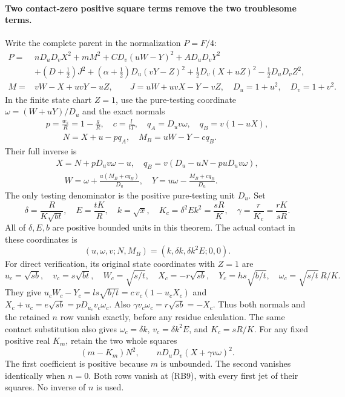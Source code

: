 \paragraph{Two contact-zero positive square terms remove the two troublesome terms.}
Write the complete parent in the normalization $P=F/4$:
\[
\begin{split}
 P={}&nD_uD_vX^2+mM^2+C D_v(uW-Y)^2+A D_uD_vY^2\\
 &+(D+\tfrac12)J^2+(\alpha+\tfrac12)D_u(vY-Z)^2
       +\tfrac12D_v(X+uZ)^2-\tfrac12D_uD_vZ^2,\\
 M={}&vW-X+uvY-uZ,\qquad J=uW+uvX-Y-vZ,
 \quad D_u=1+u^2,\quad D_v=1+v^2.
\end{split}                                                     \tag{RB5}
\]
In the finite state chart $Z=1$, use the pure-testing coordinate
$\omega=(W+uY)/D_u$ and the exact normals
\[
\begin{gathered}
 p=\frac{w_s}{R}=1-\frac gR,\quad c=\frac{l}{tT},\quad
 q_A=D_uv\omega,\quad q_B=v(1-uX),\\
 \qquad N=X+u-pq_A,\quad M_B=uW-Y-cq_B.
\end{gathered}                                    \tag{RB6}
\]
Their full inverse is
\[
\begin{gathered}
 X=N+pD_uv\omega-u,\quad q_B=v(D_u-uN-puD_uv\omega),\\
 \quad W=\omega+\frac{u(M_B+cq_B)}{D_u},\quad
 Y=u\omega-\frac{M_B+cq_B}{D_u}.
\end{gathered}                                    \tag{RB7}
\]
The only testing denominator is the positive pure-testing unit $D_u$.
Set
\[
 \delta=\frac{R}{K\sqrt{bt}},\quad E=\frac{tK}{R},\quad
 k=\sqrt x,\quad K_c=\delta^2Ek^2=\frac{sR}{K},\quad
 \gamma=\frac r{K_c}=\frac{rK}{sR}.                \tag{RB8}
\]
All of $\delta,E,b$ are positive bounded units in this theorem.
The actual contact in these coordinates is
\[
 (u,\omega,v;N,M_B)=(k,\delta k,\delta k^2E;0,0).
 \tag{RB9}
\]
For direct verification, its original state coordinates with $Z=1$ are
\[
 u_c=\sqrt{sb},\quad v_c=s\sqrt{bt},\quad
 W_c=\sqrt{s/t},\quad X_c=-r\sqrt{sb},\quad
 Y_c=hs\sqrt{b/t},\quad
 \omega_c=\sqrt{s/t}\,R/K.
 \tag{RB9a}
\]
They give $u_cW_c-Y_c=ls\sqrt{b/t}=c\,v_c(1-u_cX_c)$
and $X_c+u_c=e\sqrt{sb}=pD_{u_c}v_c\omega_c$.
Also $\gamma v_c\omega_c=r\sqrt{sb}=-X_c$.
Thus both normals and the retained $n$ row vanish exactly, before
any residue calculation. The same contact substitution also gives
$\omega_c=\delta k$, $v_c=\delta k^2E$, and $K_c=sR/K$.
For any fixed positive real $K_m$, retain the two whole squares
\[
 (m-K_m)N^2,
 \qquad nD_uD_v(X+\gamma v\omega)^2.                \tag{RB10}
\]
The first coefficient is positive because $m$ is unbounded. The second
vanishes identically when $n=0$. Both rows vanish at (RB9), with every
first jet of their squares. No inverse of $n$ is used.

